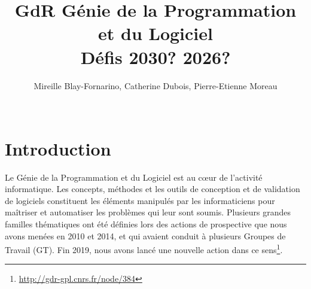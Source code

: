 \documentclass[11pt]{article}
\title{GdR Génie de la Programmation et du Logiciel\\ 
Défis 2030? 2026?}
\author{Mireille Blay-Fornarino, Catherine Dubois, Pierre-Etienne Moreau\\
\\
}
\begin{document}
\maketitle

\section{Introduction}

Le Génie de la Programmation et du Logiciel est au c{\oe}ur de l'activité
informatique. Les concepts, méthodes et les outils de conception et de
validation de logiciels constituent les éléments manipulés par les
informaticiens pour maîtriser et automatiser les problèmes qui leur sont
soumis. 
Plusieurs grandes familles thématiques ont été définies lors des actions de prospective que nous avons menées en 2010 et 2014, et qui avaient conduit à plusieurs Groupes de Travail (GT). 
Fin 2019, nous avons lancé une nouvelle action dans ce sens\footnote{\url{http://gdr-gpl.cnrs.fr/node/384}}. %
\end{document}
